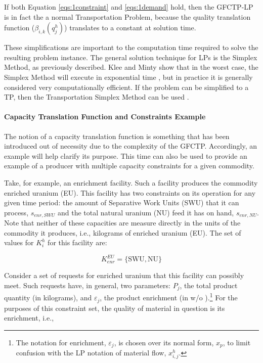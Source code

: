 If both Equation \ref{eqs:1constraint} and \ref{eqs:1demand} hold, then the
GFCTP-LP is in fact the a normal Transportation Problem, because the quality
translation function ($\beta_{i,k}(q_{j}^{h})$) translates to a constant at
solution time. 

These simplifications are important to the computation time required to solve
the resulting problem instance. The general solution technique for LPs is the
Simplex Method, as previously described. Klee and Minty show that in the worst
case, the Simplex Method will execute in exponential time \cite{klee_good_1970},
but in practice it is generally considered very computationally efficient. If
the problem can be simplified to a TP, then the Transportation Simplex Method
can be used \cite{ahuja_network_1993}.

\paragraph{Capacity Translation Function and Constraints Example}

The notion of a capacity translation function is something that has been
introduced out of necessity due to the complexity of the GFCTP. Accordingly, an
example will help clarify its purpose. This time can also be used to provide an
example of a producer with multiple capacity constraints for a given commodity.

Take, for example, an enrichment facility. Such a facility produces the
commodity enriched uranium (EU). This facility has two constraints on its
operation for any given time period: the amount of Separative Work Units (SWU)
that it can process, $s_{enr,SWU}$ and the total natural uranium (NU) feed it
has on hand, $s_{enr,NU}$. Note that neither of these capacities are measure
directly in the units of the commodity it produces, i.e., kilograms of enriched
uranium (EU). The set of values for $K_{i}^{h}$ for this facility are:

\begin{equation}\label{eqs:enr-constr-commods}
  K_{enr}^{EU} = \{ \mbox{SWU}, \mbox{NU} \}
\end{equation}

Consider a set of requests for enriched uranium that this facility can possibly
meet. Such requests have, in general, two parameters: $P_{j}$, the total product
quantity (in kilograms), and $\varepsilon_{j}$, the product enrichment (in w/o
).\footnote{The notation for enrichment, $\varepsilon_{j}$, is chosen over its
normal form, $x_p$, to limit confusion with the LP notation of material flow,
$x^h_{i,j}$.}  For the purposes of this constraint set, the quality of material
in question is its enrichment, i.e.,

